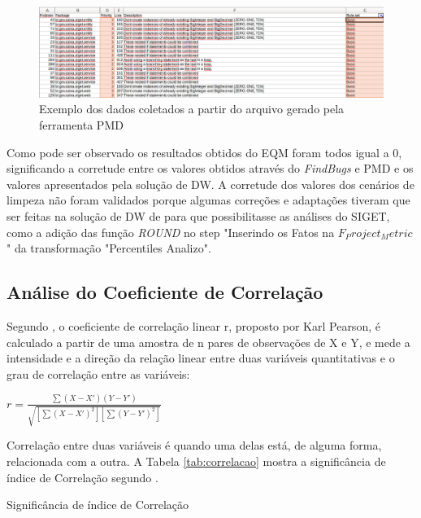 \begin{figure}[h!]
\centering
\includegraphics[keepaspectratio=false,scale=0.3]{figuras/figuras_nilton/comparacaoexcell.eps}
\caption{Exemplo dos dados coletados a partir do arquivo gerado pela ferramenta PMD}
\label{comparacaoexcell}
\end{figure}

Como pode ser observado os resultados obtidos do EQM foram todos igual a 0, significando a corretude entre os valores obtidos através do \textit{FindBugs} e PMD e os valores apresentados pela solução de DW. A corretude dos valores dos cenários de limpeza não foram validados porque algumas correções e adaptações tiveram que ser feitas na solução de DW de \cite{rego_monitoramento_2014} para que possibilitasse as análises do SIGET, como a adição das função \textit{ROUND} no step "Inserindo os Fatos na $F_Project_Metric $" da transformação "Percentiles Analizo".  


\subsection{Análise do Coeficiente de Correlação}

Segundo \cite{Wasserman2010}, o coeficiente de correlação linear r, proposto por Karl Pearson, é calculado a partir de uma amostra de n pares de observações de X e Y, e mede a intensidade e a direção da relação linear entre duas variáveis quantitativas e o grau de correlação entre as variáveis:

$ r = \frac{\sum(X-X')(Y-Y')}{\sqrt{[\sum(X-X')^{2}][\sum(Y-Y')^{2}]}} $


Correlação entre duas variáveis é quando uma delas está, de alguma forma, relacionada com a outra. A Tabela \ref{tab:correlacao} mostra a significância de índice de Correlação segundo \cite{Wasserman2010}.

\begin{table}[!ht]
	\begin{center}
 
	\caption{Significância de índice de Correlação}
	\label{tab:correlacao}
	\end{center}
	\end{table}	
	\FloatBarrier

